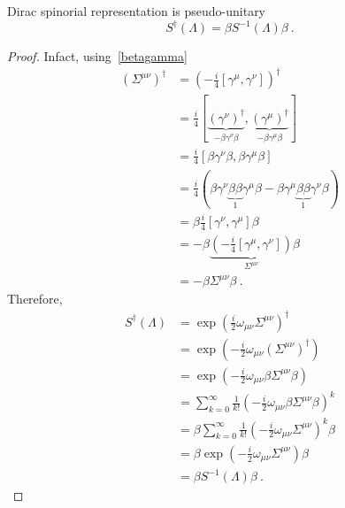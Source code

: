     Dirac spinorial representation is pseudo-unitary 
    \begin{equation*}
        S^\dagger (\Lambda) = \beta S^{-1} (\Lambda) \beta ~.
    \end{equation*}
    \begin{proof}
        Infact, using~\eqref{betagamma}
        \begin{equation*}
        \begin{aligned}
            (\Sigma^{\mu\nu})^\dagger & = (- \frac{i}{4} [\gamma^\mu, \gamma^\nu])^\dagger \\ & = \frac{i}{4} [\underbrace{(\gamma^\nu)^\dagger}_{-\beta \gamma^\nu \beta}, \underbrace{(\gamma^\mu)^\dagger}_{- \beta \gamma^\mu \beta}] \\ & = \frac{i}{4} [\beta \gamma^\nu \beta, \beta \gamma^\mu \beta] \\ & = \frac{i}{4} (\beta \gamma^\nu \underbrace{\beta \beta}_1 \gamma^\mu \beta - \beta \gamma^\mu \underbrace{\beta \beta}_1 \gamma^\nu \beta ) \\ & = \beta \frac{i}{4} [\gamma^\nu, \gamma^\mu] \beta \\ & = - \beta \underbrace{(-\frac{i}{4} [\gamma^\mu, \gamma^\nu] )}_{\Sigma^{\mu\nu}} \beta \\ & = - \beta \Sigma^{\mu\nu} \beta ~.
        \end{aligned}
        \end{equation*}
        Therefore,
        \begin{equation*}
        \begin{aligned}
            S^\dagger (\Lambda) & = \exp(\frac{i}{2} \omega_{\mu\nu} \Sigma^{\mu\nu})^\dagger \\ & = \exp(-\frac{i}{2} \omega_{\mu\nu} (\Sigma^{\mu\nu})^\dagger ) \\ & = \exp(-\frac{i}{2} \omega_{\mu\nu} \beta \Sigma^{\mu\nu} \beta ) \\ & = \sum_{k=0}^\infty \frac{1}{k!} (-\frac{i}{2} \omega_{\mu\nu} \beta \Sigma^{\mu\nu} \beta)^k \\ & = \beta \sum_{k=0}^\infty \frac{1}{k!} (-\frac{i}{2} \omega_{\mu\nu} \Sigma^{\mu\nu})^k \beta \\ & = \beta \exp(-\frac{i}{2} \omega_{\mu\nu} \Sigma^{\mu\nu}) \beta \\ & = \beta S^{-1} (\Lambda) \beta~.
        \end{aligned} 
        \end{equation*}
    \end{proof}

